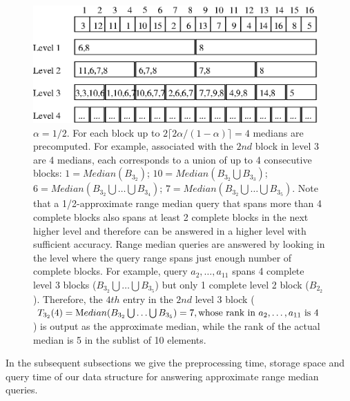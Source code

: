 \documentclass{llncs}
\begin{document}
  

\begin{figure}[htb]\label{median}
\centering
\includegraphics[height=4.5cm]{median}
\caption{$\alpha=1/2$. For each block up to $2 \lceil 2 \alpha /
  (1-\alpha) \rceil = 4$ medians
are precomputed. For example, associated with
the $2nd$ block in level 3 are 4 medians, each 
corresponds to a union of up to 4 consecutive 
blocks: $1=Median(B_{3_2})$;
$10=Median(B_{3_2} \bigcup B_{3_3})$; 
$6=Median(B_{3_2} \bigcup \ldots \bigcup B_{3_4})$;
$7=Median(B_{3_2} \bigcup \ldots \bigcup B_{3_5})$.  
Note that a 1/2-approximate range median query that spans more than 
4 complete blocks also spans
at least 2 complete blocks in the next higher level and therefore
can be answered in a higher level with sufficient accuracy. Range 
median queries are answered by looking in the level where 
the query range spans just enough number of complete blocks. 
For example, query $a_2,\ldots,a_{11}$ spans 4 complete level 3 
blocks ($B_{3_2}\bigcup \ldots \bigcup B_{3_5}$) but only 
1 complete level 2 block ($B_{2_2}$). Therefore, the $4th$ entry in 
the $2nd$ level 3 block ($T_{3_2}(4)=
{\mbox Median}(B_{3_2} \bigcup \ldots \bigcup B_{3_5}) = 7,
\mbox{whose rank in $a_2,\ldots,a_{11}$ is 4}$) is output as 
the approximate median, while the rank of the actual median 
is 5 in the sublist of 10 elements.}
\label{median}
\end{figure}




In the subsequent subsections we give the preprocessing time, 
storage space and query time of our data structure for
answering approximate range median queries.
\end{document}
